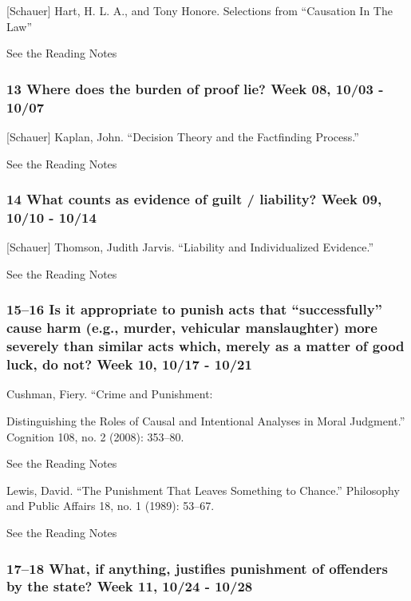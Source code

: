 \documentclass[11pt,]{article}
\begin{document}
{[}Schauer{]} Hart, H. L. A., and Tony Honore. Selections from
``Causation In The Law''

See the Reading Notes

\subsubsection{13 Where does the burden of proof lie? Week 08, 10/03 -
10/07}\label{where-does-the-burden-of-proof-lie-week-08-1003---1007}

{[}Schauer{]} Kaplan, John. ``Decision Theory and the Factfinding
Process.''

See the Reading Notes

\subsubsection{14 What counts as evidence of guilt / liability? Week 09,
10/10 -
10/14}\label{what-counts-as-evidence-of-guilt-liability-week-09-1010---1014}

{[}Schauer{]} Thomson, Judith Jarvis. ``Liability and Individualized
Evidence.''

See the Reading Notes

\subsubsection{15--16 Is it appropriate to punish acts that
``successfully'' cause harm (e.g., murder, vehicular manslaughter) more
severely than similar acts which, merely as a matter of good luck, do
not? Week 10, 10/17 -
10/21}\label{is-it-appropriate-to-punish-acts-that-successfully-cause-harm-e.g.-murder-vehicular-manslaughter-more-severely-than-similar-acts-which-merely-as-a-matter-of-good-luck-do-not-week-10-1017---1021}

Cushman, Fiery. ``Crime and Punishment:

Distinguishing the Roles of Causal and Intentional Analyses in Moral
Judgment.'' Cognition 108, no. 2 (2008): 353--80.

See the Reading Notes

Lewis, David. ``The Punishment That Leaves Something to Chance.''
Philosophy and Public Affairs 18, no. 1 (1989): 53--67.

See the Reading Notes

\subsubsection{17--18 What, if anything, justifies punishment of
offenders by the state? Week 11, 10/24 -
10/28}\label{what-if-anything-justifies-punishment-of-offenders-by-the-state-week-11-1024---1028}
\end{document}

